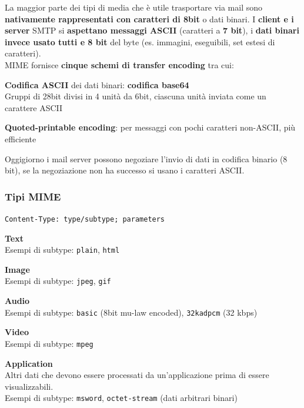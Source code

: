 \documentclass[10pt]{article}
\begin{document}
La maggior parte dei tipi di media che è utile trasportare via mail sono \textbf{nativamente rappresentati con caratteri di 8bit} o dati binari. I \textbf{client e i server} SMTP si \textbf{aspettano messaggi ASCII} (caratteri a \textbf{7 bit}), i \textbf{dati binari invece usato tutti e 8 bit} del byte (es. immagini, eseguibili, set estesi di caratteri).\\
MIME fornisce \textbf{cinque schemi di transfer encoding} tra cui:
\begin{list}{}{}
\item \textbf{Codifica ASCII} dei dati binari: \textbf{codifica base64}\\
Gruppi di 28bit divisi in 4 unità da 6bit, ciascuna unità inviata come un carattere ASCII
\item \textbf{Quoted-printable encoding}: per messaggi con pochi caratteri non-ASCII, più efficiente
\end{list}
Oggigiorno i mail server possono negoziare l’invio di dati in codifica binario (8 bit), se la negoziazione non ha successo si usano i caratteri ASCII.
\subsubsection{Tipi MIME}
\begin{center}
\texttt{Content-Type: type/subtype; parameters}
\end{center}
\begin{list}{}{}
\item \textbf{Text}\\Esempi di subtype: \texttt{plain}, \texttt{html}
\item \textbf{Image}\\Esempi di subtype: \texttt{jpeg}, \texttt{gif}
\item \textbf{Audio}\\Esempi di subtype: \texttt{basic} (8bit mu-law encoded), \texttt{32kadpcm} (32 kbps)
\item \textbf{Video}\\Esempi di subtype: \texttt{mpeg}
\item \textbf{Application}\\Altri dati che devono essere processati da un'applicazione prima di essere visualizzabili.\\Esempi di subtype: \texttt{msword}, \texttt{octet-stream} (dati arbitrari binari)
\end{list}
\end{document}
